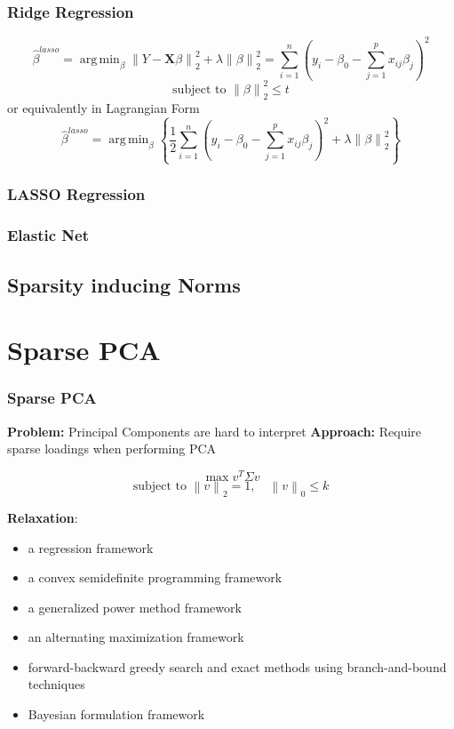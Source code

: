 \documentclass{beamer}
\theoremstyle{plain}
\theoremstyle{definition}
\newcommand{\mat}[1]{\mathbf{#1}}
\DeclareMathOperator*{\argmin}{arg\,min}
\newcommand{\norm}[1]{\left\lVert #1 \right\rVert}
\begin{document}
\begin{frame}
\frametitle{Ridge Regression}
$$\hat{\beta}^{lasso} = \argmin_{\beta} \norm{Y - \mat{X}\beta}_{2}^{2} + \lambda \norm{\beta}_{2}^{2} = \sum_{i=1}^n (y_i - \beta_0 - \sum_{j=1}^p x_{ij}\beta_j)^2$$
$$\text{subject to } \norm{\beta}_{2}^2 \leq t$$
or equivalently in Lagrangian Form
$$\hat{\beta}^{lasso} = \argmin_{\beta}\left\{\frac{1}{2}\sum_{i=1}^n (y_i - \beta_0 - \sum_{j=1}^p x_{ij}\beta_j)^2 + \lambda\norm{\beta}_{2}^2 \right\}$$
\end{frame}

\begin{frame}
\frametitle{LASSO Regression}
\end{frame}

\begin{frame}
\frametitle{Elastic Net}
\end{frame}

\subsection{Sparsity inducing Norms}


\section{Sparse PCA}

\begin{frame}
\frametitle{Sparse PCA}
\textbf{Problem:} Principal Components are hard to interpret \linebreak
\textbf{Approach:} Require sparse loadings when performing PCA

$$\max{v^T \Sigma v}$$
$$\text{subject to } \norm{v}_2 = 1, \quad \norm{v}_{0} \leq k$$

\textbf{Relaxation}:
\begin{itemize}
\item a regression framework
\item a convex semidefinite programming framework
\item a generalized power method framework
\item an alternating maximization framework
\item forward-backward greedy search and exact methods using branch-and-bound techniques
\item Bayesian formulation framework
\end{itemize}
\end{frame}
\end{document}

